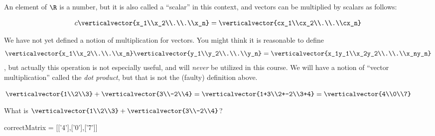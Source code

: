 \documentclass{ximera}
\begin{document}
An element of $\R$ is a number, but it is also called a ``scalar'' in this context, and vectors can be multiplied by scalars as follows:
	
\[ c\verticalvector{x_1\\x_2\\.\\.\\x_n} = \verticalvector{cx_1\\cx_2\\.\\.\\cx_n} \]
 	 
\begin{warning}
  We have not yet defined a notion of multiplication for vectors.  You might think it is reasonable to define 
  \[\verticalvector{x_1\\x_2\\.\\.\\x_n} \verticalvector{y_1\\y_2\\.\\.\\y_n}=\verticalvector{x_1y_1\\x_2y_2\\.\\.\\x_ny_n}\], but 
  actually this operation is not especially useful, and will \textit{never} be utilized in this course.  We will have a notion of ``vector multiplication'' called the \textit{dot product}, but that is not the (faulty) definition above.
\end{warning}

\begin{question}
  \begin{solution}
    \begin{hint}
      $\verticalvector{1\\2\\3}+\verticalvector{3\\-2\\4} = \verticalvector{1+3\\2+-2\\3+4} = \verticalvector{4\\0\\7}$
    \end{hint}
    What is $\verticalvector{1\\2\\3}+\verticalvector{3\\-2\\4}$?
    
    \begin{matrix-answer}[name=v]
      correctMatrix = [['4'],['0'],['7']]
    \end{matrix-answer}
  \end{solution}
\end{question}
 	
\end{document}
